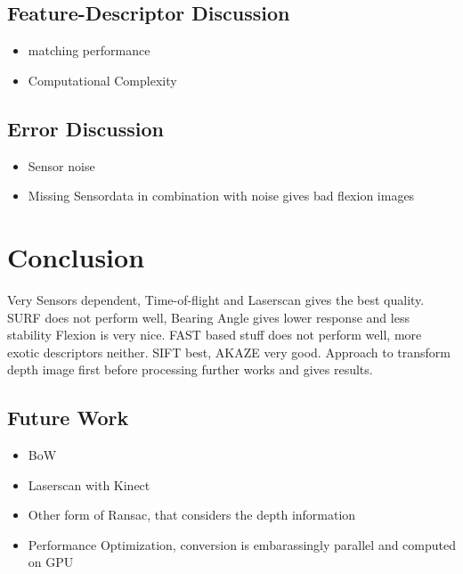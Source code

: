 \subsection{Feature-Descriptor Discussion}
\begin{itemize}
    \item matching performance
    \item Computational Complexity
\end{itemize}

\subsection{Error Discussion}
\begin{itemize}
    \item Sensor noise
    \item Missing Sensordata in combination with noise gives bad flexion images
\end{itemize}

\section{Conclusion}

Very Sensors dependent, Time-of-flight and Laserscan gives the best quality.
SURF does not perform well, Bearing Angle gives lower response and less stability
Flexion is very nice.
FAST based stuff does not perform well, more exotic descriptors neither.
SIFT best, AKAZE very good.
Approach to transform depth image first before processing further works and gives results.

\subsection{Future Work}

\begin{itemize}
    \item BoW
    \item Laserscan with Kinect
    \item Other form of Ransac, that considers the depth information
    \item Performance Optimization, conversion is embarassingly parallel and computed on GPU
\end{itemize}
